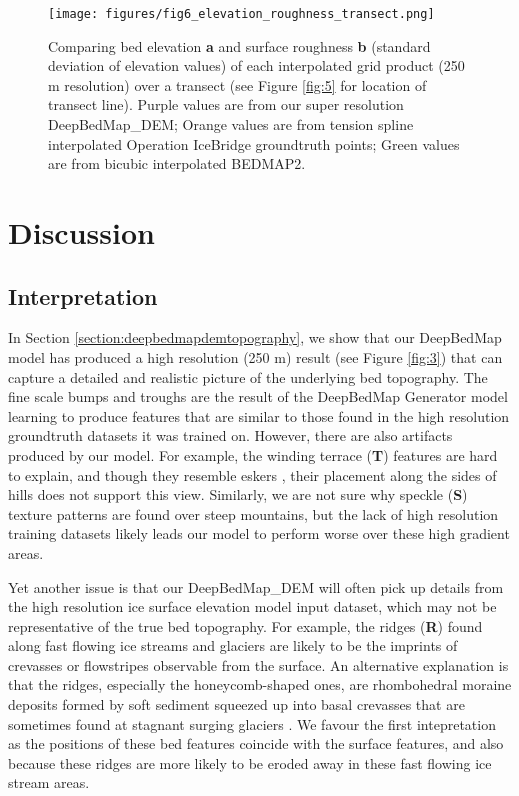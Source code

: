 \documentclass[tc, manuscript]{copernicus}
\begin{document}
\begin{figure}[htbp]
  \texttt{[image: figures/fig6\_elevation\_roughness\_transect.png]}
  \caption{
    Comparing bed elevation \textbf{a} and surface roughness \textbf{b} (standard deviation of elevation values) of each interpolated grid product (250 m resolution) over a transect (see Figure \ref{fig:5} for location of transect line).
    Purple values are from our super resolution DeepBedMap\_DEM;
    Orange values are from tension spline interpolated Operation IceBridge groundtruth points;
    Green values are from bicubic interpolated BEDMAP2.
  }
  \label{fig:6}
\end{figure}


\section{Discussion}

\subsection{Interpretation}

In Section \ref{section:deepbedmapdemtopography}, we show that our DeepBedMap model has produced a high resolution (250 m) result (see Figure \ref{fig:3}) that can capture a detailed and realistic picture of the underlying bed topography.
The fine scale bumps and troughs are the result of the DeepBedMap Generator model learning to produce features that are similar to those found in the high resolution groundtruth datasets it was trained on.
However, there are also artifacts produced by our model.
For example, the winding terrace (\textbf{T}) features are hard to explain, and though they resemble eskers \citep{DrewsActivelyevolvingsubglacial2017}, their placement along the sides of hills does not support this view.
Similarly, we are not sure why speckle (\textbf{S}) texture patterns are found over steep mountains, but the lack of high resolution training datasets likely leads our model to perform worse over these high gradient areas.

Yet another issue is that our DeepBedMap\_DEM will often pick up details from the high resolution ice surface elevation model \citep{HowatReferenceElevationModel2019} input dataset, which may not be representative of the true bed topography.
For example, the ridges (\textbf{R}) found along fast flowing ice streams and glaciers are likely to be the imprints of crevasses or flowstripes \citep{GlasserLongitudinalsurfacestructures2012} observable from the surface.
An alternative explanation is that the ridges, especially the honeycomb-shaped ones, are rhombohedral moraine deposits formed by soft sediment squeezed up into basal crevasses that are sometimes found at stagnant surging glaciers \citep{Dowdeswellvarietydistributionsubmarine2016,DowdeswellRhombohedralcrevassefillridges2016,SolheimSeafloormorphologyoutside1985}.
We favour the first intepretation as the positions of these bed features coincide with the surface features, and also because these ridges are more likely to be eroded away in these fast flowing ice stream areas.
\end{document}
